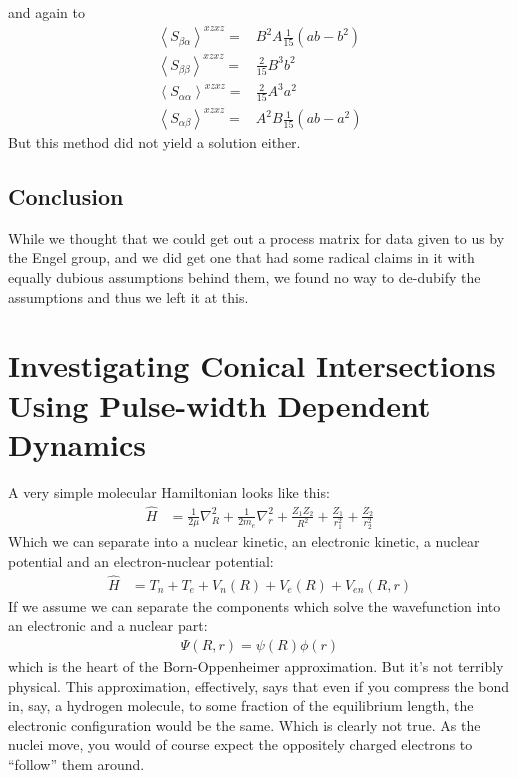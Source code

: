 and again to
\begin{align*}
	\left \langle S_{\beta \alpha} \right \rangle^{xzxz} =&   B^2 A \frac{1}{15}  \left(    a b  -  b^2 \right) \\
	\left \langle S_{\beta \beta} \right \rangle^{xzxz} =&   \frac{2}{15} B^3 b^2\\
	\left \langle S_{\alpha \alpha} \right \rangle^{xzxz} =& \frac{2}{15} A^3  a^2  \\
	\left \langle S_{\alpha \beta} \right \rangle^{xzxz} =& A^2 B \frac{1}{15}  \left( a b   - a^2    \right)
\end{align*}
But this method did not yield a solution either.


\subsection{Conclusion}
While we thought that we could get out a process matrix for data given to us by the Engel group, and we did get one that had some radical claims in it with equally dubious assumptions behind them, we found no way to de-dubify the assumptions and thus we left it at this.









\section{Investigating Conical Intersections Using Pulse-width Dependent Dynamics}
A very simple molecular Hamiltonian looks like this:
\begin{align*}
	\hat{H} &= \frac{1}{2 \mu} \nabla^2_{R} + \frac{1}{2 m_e} \nabla^2_{r}  +  \frac{Z_1 Z_2}{R^2} + \frac{Z_1}{r_1^2} + \frac{Z_2}{r_2^2}
\end{align*}
Which we can separate into a nuclear kinetic, an electronic kinetic, a nuclear potential and an electron-nuclear potential:
\begin{align*}
	\hat{H} &= T_n + T_e  + V_n(R) + V_e (R)  +  V_{en} (R, r)
\end{align*}
If we assume we can separate the components which solve the wavefunction into an electronic and a nuclear part:
\begin{align*}
	\Psi(R, r) = \psi(R) \phi(r)
\end{align*}
which is the heart of the Born-Oppenheimer approximation.  But it's not terribly physical.  This approximation, effectively, says that even if you compress the bond in, say, a hydrogen molecule, to some fraction of the equilibrium length, the electronic configuration would be the same.  Which is clearly not true.   As the nuclei move, you would of course expect the oppositely charged electrons to ``follow'' them around.

